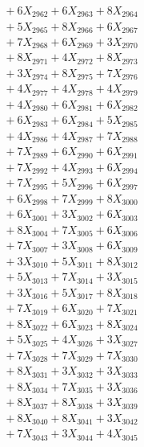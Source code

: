 \documentclass[a4paper,10pt]{article}
\begin{document}
{\begin{align}
&\;  + 6 X_{2962} + 6 X_{2963} + 8 X_{2964} \\[0.3ex]
&\;  + 5 X_{2965} + 8 X_{2966} + 6 X_{2967} \\[0.3ex]
&\;  + 7 X_{2968} + 6 X_{2969} + 3 X_{2970} \\[0.3ex]
&\;  + 8 X_{2971} + 4 X_{2972} + 8 X_{2973} \\[0.3ex]
&\;  + 3 X_{2974} + 8 X_{2975} + 7 X_{2976} \\[0.3ex]
&\;  + 4 X_{2977} + 4 X_{2978} + 4 X_{2979} \\[0.5ex]\allowbreak
&\;  + 4 X_{2980} + 6 X_{2981} + 6 X_{2982} \\[0.3ex]
&\;  + 6 X_{2983} + 6 X_{2984} + 5 X_{2985} \\[0.3ex]
&\;  + 4 X_{2986} + 4 X_{2987} + 7 X_{2988} \\[0.3ex]
&\;  + 7 X_{2989} + 6 X_{2990} + 6 X_{2991} \\[0.3ex]
&\;  + 7 X_{2992} + 4 X_{2993} + 6 X_{2994} \\[0.3ex]
&\;  + 7 X_{2995} + 5 X_{2996} + 6 X_{2997} \\[0.3ex]
&\;  + 6 X_{2998} + 7 X_{2999} + 8 X_{3000} \\[0.3ex]
&\;  + 6 X_{3001} + 3 X_{3002} + 6 X_{3003} \\[0.3ex]
&\;  + 8 X_{3004} + 7 X_{3005} + 6 X_{3006} \\[0.3ex]
&\;  + 7 X_{3007} + 3 X_{3008} + 6 X_{3009} \\[0.5ex]\allowbreak
&\;  + 3 X_{3010} + 5 X_{3011} + 8 X_{3012} \\[0.3ex]
&\;  + 5 X_{3013} + 7 X_{3014} + 3 X_{3015} \\[0.3ex]
&\;  + 3 X_{3016} + 5 X_{3017} + 8 X_{3018} \\[0.3ex]
&\;  + 7 X_{3019} + 6 X_{3020} + 7 X_{3021} \\[0.3ex]
&\;  + 8 X_{3022} + 6 X_{3023} + 8 X_{3024} \\[0.3ex]
&\;  + 5 X_{3025} + 4 X_{3026} + 3 X_{3027} \\[0.3ex]
&\;  + 7 X_{3028} + 7 X_{3029} + 7 X_{3030} \\[0.3ex]
&\;  + 8 X_{3031} + 3 X_{3032} + 3 X_{3033} \\[0.3ex]
&\;  + 8 X_{3034} + 7 X_{3035} + 3 X_{3036} \\[0.3ex]
&\;  + 8 X_{3037} + 8 X_{3038} + 3 X_{3039} \\[0.5ex]\allowbreak
&\;  + 8 X_{3040} + 8 X_{3041} + 3 X_{3042} \\[0.3ex]
&\;  + 7 X_{3043} + 3 X_{3044} + 4 X_{3045} \\[0.3ex]

\end{align}}
\end{document}
